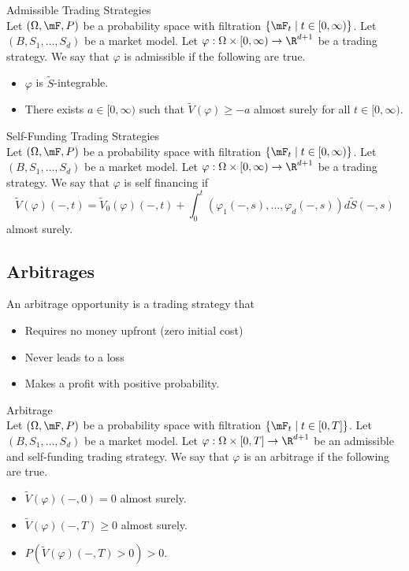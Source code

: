 \documentclass[a4paper]{article}
\begin{document}
\begin{defn}{Admissible Trading Strategies}{}\\
Let $(\Omega,\mF,P)$ be a probability space with filtration $\{\mF_t\;|\;t\in[0,\infty)\}$. Let $(B,S_1,\dots,S_d)$ be a market model. Let $\varphi:\Omega\times[0,\infty)\to\R^{d+1}$ be a trading strategy. We say that $\varphi$ is admissible if the following are true. 
\begin{itemize}
\item $\varphi$ is $\widetilde{S}$-integrable. 
\item There exists $a\in[0,\infty)$ such that $\widetilde{V}(\varphi)\geq-a$ almost surely for all $t\in[0,\infty)$. 
\end{itemize}
\end{defn}

\begin{defn}{Self-Funding Trading Strategies}{}\\
Let $(\Omega,\mF,P)$ be a probability space with filtration $\{\mF_t\;|\;t\in[0,\infty)\}$. Let $(B,S_1,\dots,S_d)$ be a market model. Let $\varphi:\Omega\times[0,\infty)\to\R^{d+1}$ be a trading strategy. We say that $\varphi$ is self financing if $$\widetilde{V}(\varphi)(-,t)=\widetilde{V}_0(\varphi)(-,t)+\int_0^t(\varphi_1(-,s),\dots,\varphi_d(-,s))d\widetilde{S}(-,s)$$ almost surely. 
\end{defn}

\subsection{Arbitrages}
An arbitrage opportunity is a trading strategy that 
\begin{itemize}
\item Requires no money upfront (zero initial cost)
\item Never leads to a loss
\item Makes a profit with positive probability. 
\end{itemize}

\begin{defn}{Arbitrage}{}\\
Let $(\Omega,\mF,P)$ be a probability space with filtration $\{\mF_t\;|\;t\in[0,T]\}$. Let $(B,S_1,\dots,S_d)$ be a market model. Let $\varphi:\Omega\times[0,T]\to\R^{d+1}$ be an admissible and self-funding trading strategy. We say that $\varphi$ is an arbitrage if the following are true. 
\begin{itemize}
\item $\widetilde{V}(\varphi)(-,0)=0$ almost surely. 
\item $\widetilde{V}(\varphi)(-,T)\geq 0$ almost surely. 
\item $P(\widetilde{V}(\varphi)(-,T)>0)>0$. 
\end{itemize}
\end{defn}
\end{document}
